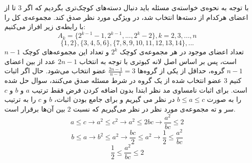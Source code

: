 \p
با توجه به نحوه‌ی خواسته‌ی مسئله باید دنبال دسته‌های کوچک‌تری بگردیم که اگر 3 تا از اعضای هرکدام از دسته‌ها انتخاب شد، در ویژگی مورد نظر صدق کند. مجموعه‌ی کل را با رابطه‌ی زیر افراز می‌کنیم:
    \[A_k = \{2^{k-1}-1,2^{k-1},...,2^{k}-2\} , k=2,3,...,n\]
    \[\{1,2\}, \{3,4,5,6\}, \{7,8,9,10,11,12,13,14\}, ...\]
    تعداد اعضای موجود در هر مجموعه‌ی کوچک \(2^k\) و تعداد این مجموعه‌های کوچک
     $n-1$
     است، پس بر اساس اصل لانه کبوتری با توجه به انتخاب
     $2n-1$
     عدد  از بین اعضای
      $n-1$ 
     گروه، حداقل از یکی از گروه‌ها \(\frac{2n-1}{n-1} = 3\) عضو انتخاب می‌شود. حال اگر اثبات کنیم
      $3$ 
     عضو انتخاب شده از یک گروه در شرط مسئله صدق می‌کنند، سوال حل شده است.
     \p
    برای اثبات نامساوی مد نظر ابتدا بدون اضافه کردن فرض فقط ترتیب 
    $a$
    و
    $b$
    و
    $c$
     را به صورت \(b\leq a\leq c\) در نظر می گیریم و برای جامع بودن اثبات، 
    $b$
    و
    $c$
     را به ترتیب سر و ته مجموعه‌ی مورد نظر در نظر می‌گیریم که نسبت
      $2$ 
    بین آن‌ها برقرار است.
    \[a\leq c \to a^2\leq c^2 \to a^2\leq 2bc \to \frac{a^2}{bc}\leq 2\]
    \[b\leq a \to b^2\leq a^2 \to \frac{bc}{2}\leq a^2 \to \frac{1}{2}\leq\frac{a^2}{bc}\]
    \[\frac{1}{2}\leq\frac{a^2}{bc}\leq2\]